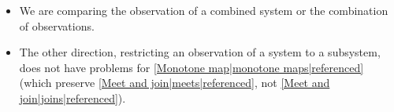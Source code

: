 \begin{itemize}
  \item  We are comparing the observation of a combined system or the combination of observations.
  \item The other direction, restricting an observation of a system to a subsystem, does not have problems for \ref{Monotone map|monotone maps|referenced} (which preserve \ref{Meet and join|meets|referenced}, not \ref{Meet and join|joins|referenced}).

\end{itemize}
